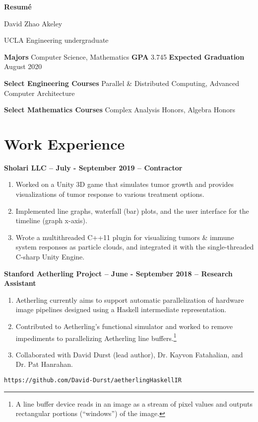\documentclass[11pt]{article}
\begin{document}
\begin{center}
\Large{\textbf{Resum\'e}}

\normalsize David Zhao Akeley

UCLA Engineering undergraduate
\end{center}


\textbf{Majors} Computer Science, Mathematics
\hfill \textbf{GPA} 3.745 %
\hfill \textbf{Expected Graduation} August 2020

\textbf{Select Engineering Courses} Parallel \& Distributed Computing,
Advanced Computer Architecture

\textbf{Select Mathematics Courses} Complex Analysis Honors, Algebra Honors

\section{Work Experience}

\textbf{Sholari LLC -- July - September 2019 -- Contractor}
\begin{enumerate}
\item Worked on a Unity 3D game that simulates tumor growth and
  provides visualizations of tumor response to various treatment
  options.
\item Implemented line graphs, waterfall (bar) plots, and the user
  interface for the timeline (graph x-axis).
\item Wrote a multithreaded C++11 plugin for visualizing tumors \&
  immune system responses as particle clouds, and integrated it with
  the single-threaded C-sharp Unity Engine.
\end{enumerate}

\textbf{Stanford Aetherling Project -- June - September 2018 --
  Research Assistant}
\begin{enumerate}
\item Aetherling currently aims to support automatic parallelization
  of hardware image pipelines designed using a Haskell intermediate
  representation.
\item Contributed to Aetherling's functional simulator and worked to
  remove impediments to parallelizing Aetherling line
  buffers.\footnote{A line buffer device reads in an image as a stream
    of pixel values and outputs rectangular portions (``windows'') of
    the image.}
\item Collaborated with David Durst (lead author), Dr. Kayvon
  Fatahalian, and Dr. Pat Hanrahan.
\end{enumerate}
\quad\texttt{https://github.com/David-Durst/aetherlingHaskellIR}
\end{document}
